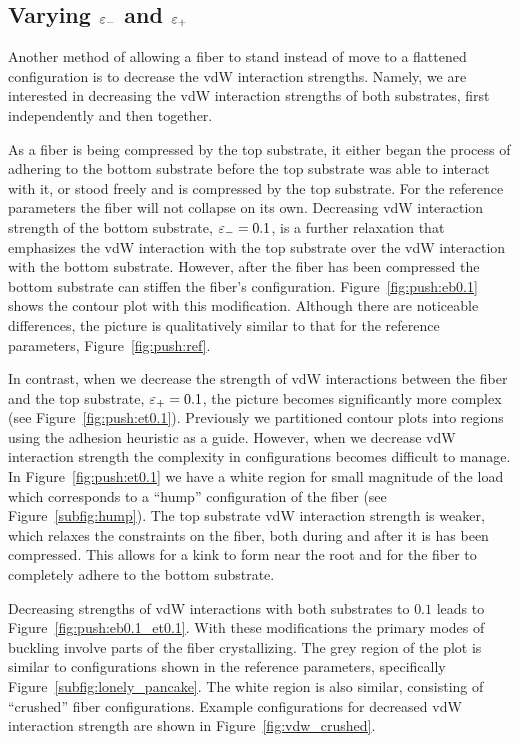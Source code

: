 \subsection{Varying $\varepsilon_-$ and $\varepsilon_+$} \label{subsection:push:eps}

Another method of allowing a fiber to stand instead of move to a flattened configuration is to decrease the vdW interaction strengths. Namely, we are interested in decreasing the vdW interaction strengths of both substrates, first independently and then together.

\enlargethispage{-\baselineskip}
As a fiber is being compressed by the top substrate, it either began the process of adhering to the bottom substrate before the top substrate was able to interact with it, or stood freely and is compressed by the top substrate. For the reference parameters the fiber will not collapse on its own. Decreasing vdW interaction strength of the bottom substrate, $\varepsilon_-=0.1$, is a further relaxation that emphasizes the vdW interaction with the top substrate over the vdW interaction with the bottom substrate. However, after the fiber has been compressed the bottom substrate can stiffen the fiber's configuration. Figure~\ref{fig:push:eb0.1} shows the contour plot with this modification. Although there are noticeable differences, the picture is qualitatively similar to that for the reference parameters, Figure~\ref{fig:push:ref}.

\enlargethispage{-\baselineskip}
In contrast, when we decrease the strength of vdW interactions between the fiber and the top substrate, $\varepsilon_+=0.1$, the picture becomes significantly more complex (see Figure~\ref{fig:push:et0.1}). Previously we partitioned contour plots into regions using the adhesion heuristic as a guide. However, when we decrease vdW interaction strength the complexity in configurations becomes difficult to manage. In Figure~\ref{fig:push:et0.1} we have a white region for small magnitude of the load which corresponds to a ``hump'' configuration of the fiber (see Figure~\ref{subfig:hump}). The top substrate vdW interaction strength is weaker, which relaxes the constraints on the fiber, both during and after it is has been compressed. This allows for a kink to form near the root and for the fiber to completely adhere to the bottom substrate.

Decreasing strengths of vdW interactions with both substrates to $0.1$ leads to Figure~\ref{fig:push:eb0.1_et0.1}. With these modifications the primary modes of buckling involve parts of the fiber crystallizing. The grey region of the plot is similar to configurations shown in the reference parameters, specifically Figure~\ref{subfig:lonely_pancake}. The white region is also similar, consisting of ``crushed'' fiber configurations. Example configurations for decreased vdW interaction strength are shown in Figure~\ref{fig:vdw_crushed}.
	
